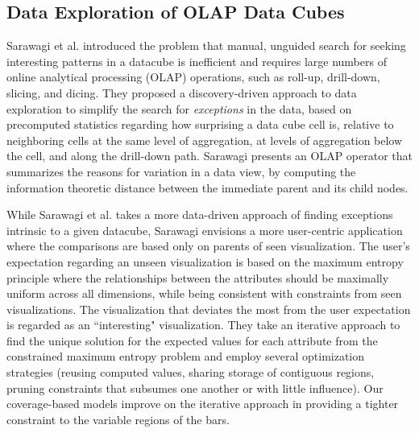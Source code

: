 
\subsection{Data Exploration of OLAP Data Cubes} 
Sarawagi et al.\cite{Sarawagi1998} introduced the problem that manual, unguided search for seeking interesting patterns in a datacube is inefficient and requires large numbers of online analytical processing (OLAP) operations, such as roll-up, drill-down, slicing, and dicing. They proposed a discovery-driven approach to data exploration to simplify the search for \textit{exceptions} in the data, based on precomputed statistics regarding how surprising a data cube cell is, relative to neighboring cells at the same level of aggregation, at levels of aggregation below the cell, and along the drill-down path. Sarawagi \cite{Sarawagi1999} presents an OLAP operator that summarizes the reasons for variation in a data view, by computing the information theoretic distance between the immediate parent and its child nodes.
\par While Sarawagi et al. \cite{Sarawagi1998} takes a more data-driven approach of finding exceptions intrinsic to a given datacube, Sarawagi \cite{Sarawagi2000} envisions a more user-centric application where the comparisons are based only on parents of seen visualization. The user's expectation regarding an unseen visualization is based on the maximum entropy principle where the relationships between the attributes should be maximally uniform across all dimensions, while being consistent with constraints from seen visualizations. The visualization that deviates the most from the user expectation is regarded as an ``interesting" visualization. They take an iterative approach to find the unique solution for the expected values for each attribute from the constrained maximum entropy problem and employ several optimization strategies (reusing computed values, sharing storage of contiguous regions, pruning constraints that subsumes one another or with little influence). Our coverage-based models improve on the iterative approach in providing a tighter constraint to the variable regions of the bars.
